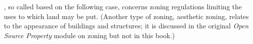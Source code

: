 , so called based on the following case, concerns zoning
regulations limiting the uses to which land may be put. (Another type of zoning,
aesthetic zoning, relates to the appearance of buildings and structures; it is
discussed in the original \emph{Open Source Property} module on zoning but not
in this book.)

